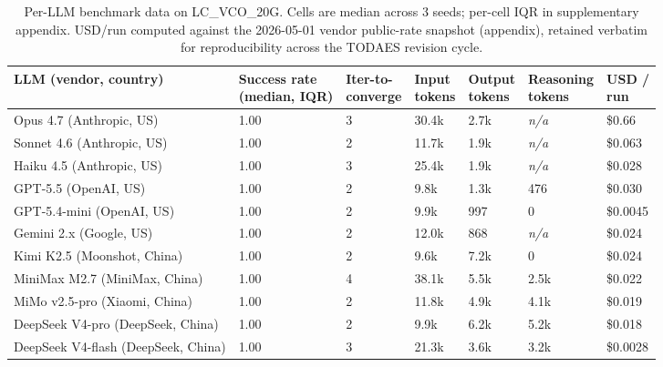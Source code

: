 \begin{table}[t]
  \centering
  \caption{Per-LLM benchmark data on LC\_VCO\_20G. Cells are
    median across 3 seeds; per-cell IQR in supplementary appendix.
    USD/run computed against the 2026-05-01 vendor public-rate
    snapshot (appendix), retained verbatim for reproducibility
    across the TODAES revision cycle.}
  \label{tab:percellm}
  \footnotesize
  \begin{tabular}{l l l l l l l}
    \toprule
    \textbf{LLM (vendor, country)} &
      \makecell[l]{\textbf{Success rate}\\\textbf{(median, IQR)}} &
      \makecell[l]{\textbf{Iter-to-}\\\textbf{converge}} &
      \makecell[l]{\textbf{Input}\\\textbf{tokens}} &
      \makecell[l]{\textbf{Output}\\\textbf{tokens}} &
      \makecell[l]{\textbf{Reasoning}\\\textbf{tokens}} &
      \makecell[l]{\textbf{USD /}\\\textbf{run}} \\
    \midrule
    Opus 4.7 (Anthropic, US)            & 1.00 & 3 & 30.4k & 2.7k  & \textit{n/a} & \$0.66   \\
    Sonnet 4.6 (Anthropic, US)          & 1.00 & 2 & 11.7k & 1.9k  & \textit{n/a} & \$0.063  \\
    Haiku 4.5 (Anthropic, US)           & 1.00 & 3 & 25.4k & 1.9k  & \textit{n/a} & \$0.028  \\
    GPT-5.5 (OpenAI, US)                & 1.00 & 2 & 9.8k  & 1.3k  & 476          & \$0.030  \\
    GPT-5.4-mini (OpenAI, US)           & 1.00 & 2 & 9.9k  & 997   & 0            & \$0.0045 \\
    Gemini 2.x (Google, US)             & 1.00 & 2 & 12.0k & 868   & \textit{n/a} & \$0.024  \\
    Kimi K2.5 (Moonshot, China)         & 1.00 & 2 & 9.6k  & 7.2k  & 0            & \$0.024  \\
    MiniMax M2.7 (MiniMax, China)       & 1.00 & 4 & 38.1k & 5.5k  & 2.5k         & \$0.022  \\
    MiMo v2.5-pro (Xiaomi, China)       & 1.00 & 2 & 11.8k & 4.9k  & 4.1k         & \$0.019  \\
    DeepSeek V4-pro (DeepSeek, China)   & 1.00 & 2 & 9.9k  & 6.2k  & 5.2k         & \$0.018  \\
    DeepSeek V4-flash (DeepSeek, China) & 1.00 & 3 & 21.3k & 3.6k  & 3.2k         & \$0.0028 \\
    \bottomrule
  \end{tabular}
\end{table}

